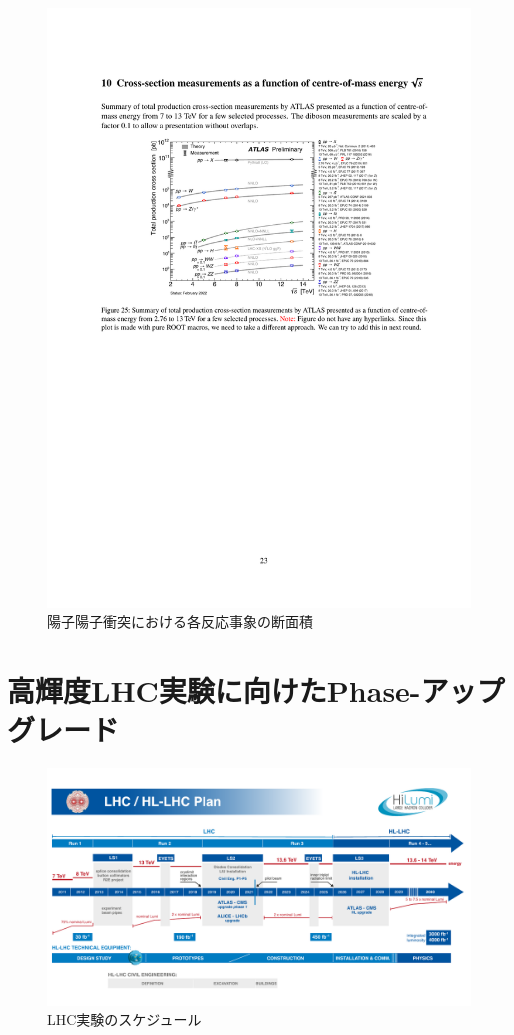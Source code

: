 \begin{figure} 
    \centering
    \includegraphics[width=16cm]{fig/Intro/LHCcrosssection.pdf}
    \caption[陽子陽子衝突における各反応事象の断面積]{陽子陽子衝突における各反応事象の断面積 \cite{atlas_phys_pub_hllhc}}
    \label{LHCcrosssection}
\end{figure}


\section{高輝度LHC実験に向けたPhase-\two アップグレード}
\label{sec_intro_phase2upgrade}

\begin{figure} 
\centering
\includegraphics[width=16cm]{fig/Intro/LHCschedule.pdf}
\caption[LHC実験のスケージュール]{LHC実験のスケジュール\cite{cern_hllhc_industry}}
\label{LHCschedule}
\end{figure}

